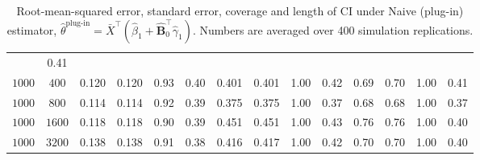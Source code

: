 \begin{table}[H]
{\begin{tabular}{ccccclccclcccl|}
&      0.41\\
$1000$                       & \multicolumn{1}{c|}{$400$
}   &      0.120&    0.120&      0.93& \multicolumn{1}{l|}{0.40}    &      0.401&    0.401&      1.00& \multicolumn{1}{l|}{0.42}    &        0.69&      0.70&       1.00
&      0.41\\
$1000$                       & \multicolumn{1}{c|}{$800$
}   &      0.114&    0.114&      0.92& \multicolumn{1}{l|}{0.39}    &      0.375&    0.375&      1.00& \multicolumn{1}{l|}{0.37}    &        0.68&      0.68&       1.00
&      0.37\\
$1000$                       & \multicolumn{1}{c|}{$1600$
}  &      0.118&    0.118&      0.90& \multicolumn{1}{l|}{0.39}    &      0.451&    0.451&      1.00& \multicolumn{1}{l|}{0.43}    &        0.76&      0.76&       1.00
&      0.40\\
$1000$                       & \multicolumn{1}{c|}{$3200$}  &      0.138&    0.138&      0.91& \multicolumn{1}{l|}{0.38}    &      0.416&    0.417&      1.00& \multicolumn{1}{l|}{0.42}    &        0.70&      0.70&       1.00&      0.40\\ \hline
\end{tabular}%
}
\caption{Root-mean-squared error, standard error, coverage and length of CI under Naive (plug-in) estimator, $\hat \theta^{\text{plug-in}} = \bar X^\top (\hat \beta_1 + \hat{\mathbf B}_0^\top \hat \gamma_1)$. Numbers are averaged over 400 simulation replications.}
\end{table}
